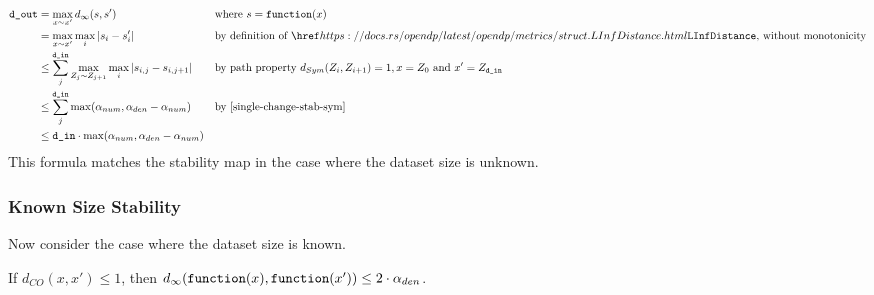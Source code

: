 \documentclass{article}
\begin{document}
\begin{align*}
    \dout &= \max\limits_{x \sim x'} d_{\infty}(s, s') &&\text{where } s = \function(x)\\
    &= \max\limits_{x \sim x'} \max\limits_{i} |s_i - s'_i| &&\text{by definition of }\rustdoc{metrics/struct}{LInfDistance} \text{, without monotonicity} \\
    &\leq \sum_j^{\din} \max\limits_{Z_{j} \sim Z_{j+1}} \max\limits_{i} |s_{i,j} - s_{i,j+1}| &&\text{by path property } d_{Sym}(Z_i, Z_{i+1}) = 1, x = Z_0 \text{ and } x' = Z_\din \\
    &\leq \sum_j^{\din} \max(\alpha_{num}, \alpha_{den} - \alpha_{num}) &&\text{by \ref{single-change-stab-sym}} \\
    &\leq \din \cdot \max(\alpha_{num}, \alpha_{den} - \alpha_{num}) \\
\end{align*}
\label{sec:unknown-size}
This formula matches the stability map in the case where the dataset size is unknown.


\subsubsection{Known Size Stability}
\label{sec:known-size}
Now consider the case where the dataset size is known.

\begin{lemma}
    \label{single-change-stab}
    If $d_{CO}(x, x') \le 1$, then $d_\infty(\texttt{function}(x), \texttt{function}(x')) \le 2 \cdot \alpha_{den}$.
\end{lemma}
\end{document}
